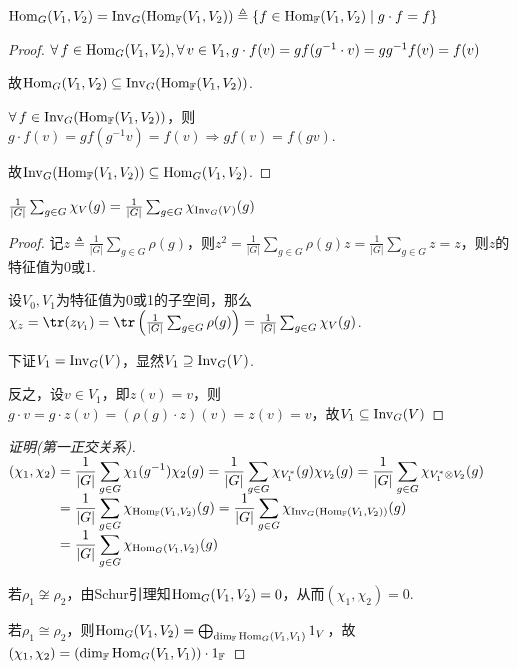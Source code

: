 \begin{lemma}[]
    $\operatorname{Hom}_G(V_1,V_2)=\operatorname{Inv}_G(\operatorname{Hom}_\mathbb{F}(V_1,V_2))\triangleq \{f\in \operatorname{Hom}_\mathbb{F}(V_1,V_2)\mid g\cdot f=f\}$
\end{lemma}

\begin{proof}
    $\forall\, f\in \operatorname{Hom}_G(V_1,V_2),\forall\, v\in V_1, g\cdot f(v)=gf(g^{-1}\cdot v)=gg^{-1}f(v)=f(v)$\par
    故$\operatorname{Hom}_G(V_1,V_2)\subseteq \operatorname{Inv}_G(\operatorname{Hom}_\mathbb{F}(V_1,V_2))$.\par
    $\forall\, f\in \operatorname{Inv}_G(\operatorname{Hom}_\mathbb{F}(V_1,V_2))$，则$g\cdot f(v)=gf(g^{-1}v)=f(v)\Rightarrow gf(v)=f(gv)$.\par
    故$\operatorname{Inv}_G(\operatorname{Hom}_\mathbb{F}(V_1,V_2))\subseteq \operatorname{Hom}_G(V_1,V_2)$.
\end{proof}

\begin{lemma}[]
    $\frac{1}{|G|}\sum_{g\in G}\chi_V(g)=\frac{1}{|G|}\sum_{g\in G}\chi_{\operatorname{Inv}_G(V)}(g)$
\end{lemma}

\begin{proof}
    记$z\triangleq\frac{1}{|G|}\sum_{g\in G}\rho(g)$，则$z^2=\frac{1}{|G|}\sum_{g\in G}\rho(g)z=\frac{1}{|G|}\sum_{g\in G}z=z$，则$z$的特征值为$0$或$1$.\par
    设$V_0,V_1$为特征值为0或1的子空间，那么$\chi_z=\tr(z_{V_1})=\tr\left(\frac{1}{|G|}\sum_{g\in G}\rho(g)\right)=\frac{1}{|G|}\sum_{g\in G}\chi_V(g)$.\par
    下证$V_1=\operatorname{Inv}_G(V)$，显然$V_1\supseteq \operatorname{Inv}_G(V)$.\par
    反之，设$v\in V_1$，即$z(v)=v$，则$g\cdot v=g\cdot z(v)=(\rho(g)\cdot z)(v)=z(v)=v$，故$V_1\subseteq \operatorname{Inv}_G(V)$
\end{proof}

\begin{proof}[证明(第一正交关系)]\par
    $\setjot[-2]\begin{aligned}[t]
    (\chi_1,\chi_2) &= \frac{1}{|G|}\sum_{g\in G}\chi_1(g^{-1})\chi_2(g)=\frac{1}{|G|}\sum_{g\in G}\chi_{V_1^*}(g)\chi_{V_2}(g)=\frac{1}{|G|}\sum_{g\in G}\chi_{V_1^*\otimes V_2}(g) \\
    &= \frac{1}{|G|}\sum_{g\in G}\chi_{\Hom_\mathbb{F}(V_1,V_2)}(g) =\frac{1}{|G|}\sum_{g\in G}\chi_{\inv_G(\Hom_\mathbb{F}(V_1,V_2))}(g) \\
    &= \frac{1}{|G|}\sum_{g\in G}\chi_{\Hom_G(V_1,V_2)}(g)
    \end{aligned}$\par
    若$\rho_1\not\cong\rho_2$，由Schur引理知$\operatorname{Hom}_G(V_1,V_2)=0$，从而$(\chi_1,\chi_2)=0$.\par
    若$\rho_1\cong\rho_2$，则$\operatorname{Hom}_G(V_1,V_2)=\bigoplus_{\dim_\mathbb{F}\operatorname{Hom}_G(V_1,V_1)} 1_V$，故$(\chi_1,\chi_2)=(\dim_\mathbb{F}\operatorname{Hom}_G(V_1,V_1))\cdot 1_\mathbb{F}$
\end{proof}


